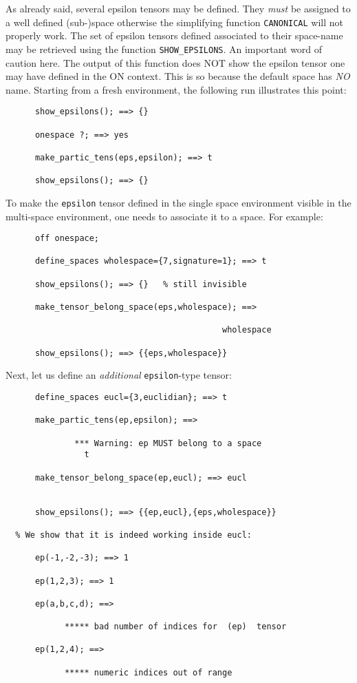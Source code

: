 As already said, several epsilon tensors may be defined. They \emph{must} 
be assigned to a well defined (sub-)space otherwise the simplifying 
function \texttt{CANONICAL} will not properly work.
The set of epsilon tensors defined  associated to their space-name 
may be retrieved using the function  
\texttt{SHOW\_EPSILONS}.
An important word of caution here. The output of this function does NOT 
show the epsilon tensor one may have defined in the ON  context. 
This is so because the default space has \emph{NO} name.
Starting  from a fresh environment, the following run illustrates 
this point:
\begin{verbatim}
      show_epsilons(); ==> {}

      onespace ?; ==> yes

      make_partic_tens(eps,epsilon); ==> t

      show_epsilons(); ==> {}
\end{verbatim}
To make the \texttt{epsilon} tensor defined in the single space environment 
visible in the multi-space environment, one needs to associate it to 
a space.
For example:
\begin{verbatim}
      off onespace;

      define_spaces wholespace={7,signature=1}; ==> t

      show_epsilons(); ==> {}   % still invisible

      make_tensor_belong_space(eps,wholespace); ==> 

                                            wholespace

      show_epsilons(); ==> {{eps,wholespace}}
\end{verbatim}
Next, let us define an \emph{additional} \texttt{epsilon}-type tensor: 
\begin{verbatim}
      define_spaces eucl={3,euclidian}; ==> t

      make_partic_tens(ep,epsilon); ==>

              *** Warning: ep MUST belong to a space
                t

      make_tensor_belong_space(ep,eucl); ==> eucl


      show_epsilons(); ==> {{ep,eucl},{eps,wholespace}}
  
  % We show that it is indeed working inside eucl:

      ep(-1,-2,-3); ==> 1

      ep(1,2,3); ==> 1

      ep(a,b,c,d); ==> 

            ***** bad number of indices for  (ep)  tensor

      ep(1,2,4); ==> 

            ***** numeric indices out of range  
\end{verbatim}
